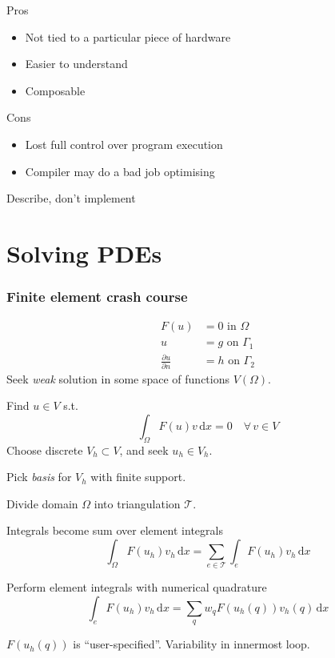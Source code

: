 \documentclass[presentation]{beamer}
\begin{document}
\begin{frame}
  \begin{block}{Pros}
    \begin{itemize}
    \item Not tied to a particular piece of hardware
    \item Easier to understand
    \item Composable
    \end{itemize}
  \end{block}
  \begin{block}{Cons}
    \begin{itemize}
    \item Lost full control over program execution
    \item Compiler may do a bad job optimising
    \end{itemize}
  \end{block}
\end{frame}

\begin{frame}[standout]
  Describe, don't implement
\end{frame}

\section{Solving PDEs}

\begin{frame}[allowframebreaks]
  \frametitle{Finite element crash course}
  \begin{align*}
    F(u) &= 0 \text{ in $\Omega$}\\
    u &= g \text{ on $\Gamma_1$}\\
    \frac{\partial u}{\partial n} &= h \text{ on $\Gamma_2$}
  \end{align*}
  Seek \emph{weak} solution in some space of functions $V(\Omega)$.

  Find $u\in V$ s.t.
\begin{equation*}
\int_\Omega \!F(u) v\, \text{d}x = 0 \quad \forall\, v \in V
\end{equation*}
Choose discrete $V_h \subset V$, and seek $u_h \in V_h$.

Pick \emph{basis} for $V_h$ with finite support.

\pagebreak
Divide domain $\Omega$ into triangulation $\mathcal{T}$.

Integrals become sum over element integrals
\begin{equation*}
  \int_\Omega\! F(u_h) v_h \, \text{d}x =
  \sum_{e \in \mathcal{T}} \int_e\! F(u_h)v_h\, \text{d}x
\end{equation*}

Perform element integrals with numerical quadrature
\begin{equation*}
  \int_e F(u_h)v_h\,\text{d}x = \sum_q w_q F(u_h(q)) v_h(q)\,\text{d}x
\end{equation*}

$F(u_h(q))$ is ``user-specified''.  Variability in innermost loop.
\end{frame}
\end{document}
